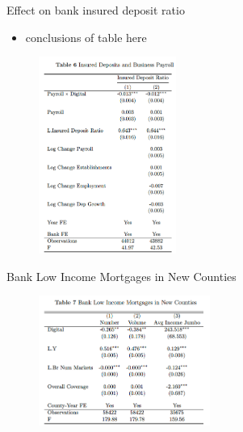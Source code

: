 \documentclass[notes,10pt, aspectratio=169]{beamer}
\begin{document}
\begin{frame}{Effect on bank insured deposit ratio}
    \begin{itemize}
        \item conclusions of table here
    \end{itemize}

    \begin{figure}
    \centering
    \includegraphics[width=0.4\textwidth]{imgs/tab6.png}
    \end{figure}

\end{frame}

\begin{frame}{Bank Low Income Mortgages in New Counties}


    \begin{figure}
        \centering
        \includegraphics[width=0.5\textwidth]{imgs/tab7.png}
    \end{figure}
    
\end{frame}
\end{document}
